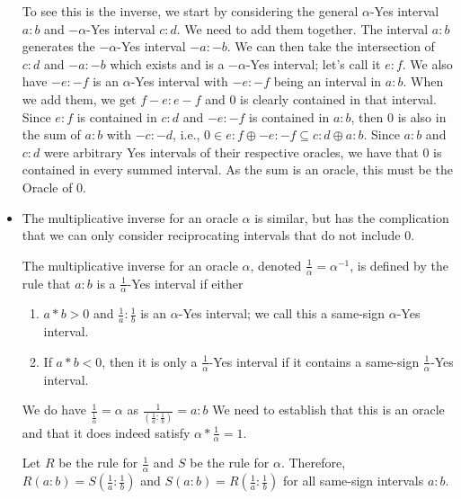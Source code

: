 \documentclass[12pt]{article}
\begin{document}
\begin{itemize}
    To see this is the inverse, we start by considering the general $\alpha$-Yes interval $a:b$ and $-\alpha$-Yes interval $c:d$. We need to add them together. The interval $a:b$ generates the $-\alpha$-Yes interval $-a:-b$. We can then take the intersection of $c:d$ and $-a:-b$ which exists and is a $-\alpha$-Yes interval; let's call it $e:f$. We also have $-e:-f$ is an $\alpha$-Yes interval with $-e:-f$ being an interval in $a:b$. When we add them, we get $f-e:e-f$ and $0$ is clearly contained in that interval. Since $e:f$ is contained in $c:d$ and $-e:-f$ is contained in $a:b$, then $0$ is also in the sum of $a:b$ with $-c:-d$, i.e.,  $0 \in e:f \oplus -e:-f \subseteq c:d \oplus a:b$. Since $a:b$ and $c:d$ were arbitrary Yes intervals of their respective oracles, we have that 0 is contained in every summed interval. As the sum is an oracle, this must be the Oracle of $0$.
    
    \item The multiplicative inverse for an oracle $\alpha$ is similar, but has the complication that we can only consider reciprocating intervals that do not include 0. 
    
    The multiplicative inverse for an oracle $\alpha$, denoted $\frac{1}{\alpha} = \alpha^{-1}$, is defined by the rule that $a:b$ is a $\frac{1}{\alpha}$-Yes interval if either 
    
    \begin{enumerate}
        \item  $a*b > 0$  and $\frac{1}{a}:\frac{1}{b}$ is an $\alpha$-Yes interval; we call this a same-sign $\alpha$-Yes interval.
        \item If $a*b<0$, then it is only a $\frac{1}{\alpha}$-Yes interval if it contains a same-sign $\frac{1}{\alpha}$-Yes interval. 
    \end{enumerate}
    
    We do have $\frac{1}{\frac{1}{\alpha}} = \alpha$ as $\frac{1}{(\frac{1}{a}: \frac{1}{b})} = a:b$ We need to establish that this is an oracle and that it does indeed satisfy $\alpha * \frac{1}{\alpha} = 1$.
    
     Let $R$ be the rule for $\frac{1}{\alpha}$ and $S$ be the rule for $\alpha$. Therefore, $R(a:b)=S(\frac{1}{a}:\frac{1}{b})$ and $S(a:b) = R(\frac{1}{a}:\frac{1}{b})$ for all same-sign intervals $a:b$.
    

\end{itemize}
\end{document}
